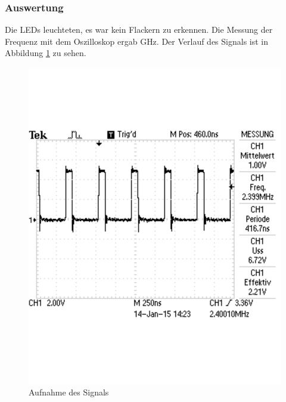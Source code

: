 \documentclass[12pt,a4paper]{article}
\begin{document}
\subsubsection*{Auswertung}

Die LEDs leuchteten, es war kein Flackern zu erkennen. Die Messung der Frequenz mit dem Oszilloskop ergab \unit[2,4]{GHz}. Der Verlauf des Signals ist in Abbildung \ref{fig:g_1} zu sehen.

\begin{figure}[H] 
  \centering 	
    \includegraphics[trim = 0mm 50mm 0mm 50mm, clip, scale = 0.4]{TEK0000.pdf}
  	\caption[Aufnahme des Signals]{Aufnahme des Signals} 
  \label{fig:g_1}
\end{figure}
\end{document}
